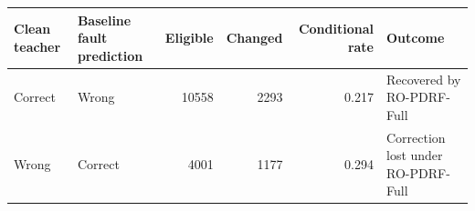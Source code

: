 \begin{tabular}{llrrrl}
\toprule
Clean teacher & Baseline fault prediction & Eligible & Changed & Conditional rate & Outcome \\
\midrule
Correct & Wrong & 10558 & 2293 & 0.217 & Recovered by RO-PDRF-Full \\
Wrong & Correct & 4001 & 1177 & 0.294 & Correction lost under RO-PDRF-Full \\
\bottomrule
\end{tabular}